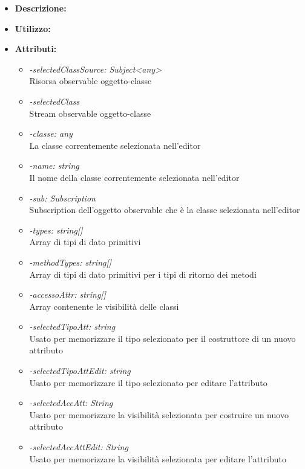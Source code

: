 \begin{itemize}
	\item \textbf{Descrizione:}\\
	
	\item \textbf{Utilizzo:}\\
	
	\item \textbf{Attributi:}
		\begin{itemize}
			\item \emph{-selectedClassSource: Subject<any>}\\
			Risorsa observable oggetto-classe
			\item \emph{-selectedClass}\\
			Stream observable oggetto-classe
			\item \emph{-classe: any}\\
			La classe correntemente selezionata nell'editor
			\item \emph{-name: string}\\
			Il nome della classe correntemente selezionata nell'editor
			\item \emph{-sub: Subscription}\\
			Subscription dell'oggetto observable che è la classe selezionata nell'editor
			\item \emph{-types: string[]}\\
			Array di tipi di dato primitivi
			\item \emph{-methodTypes: string[]}\\
			Array di tipi di dato primitivi per i tipi di ritorno dei metodi
			\item \emph{-accessoAttr: string[]}\\
			Array contenente le visibilità delle classi
			\item \emph{-selectedTipoAtt: string}\\
			Usato per memorizzare il tipo selezionato per il costruttore di un nuovo attributo
			\item \emph{-selectedTipoAttEdit: string}\\
			Usato per memorizzare il tipo selezionato per editare l'attributo
			\item \emph{-selectedAccAtt: String}\\
			Usato per memorizzare la visibilità selezionata per costruire un nuovo attributo
			\item \emph{-selectedAccAttEdit: String}\\
			Usato per memorizzare la visibilità selezionata per editare l'attributo

\end{itemize}
\end{itemize}
